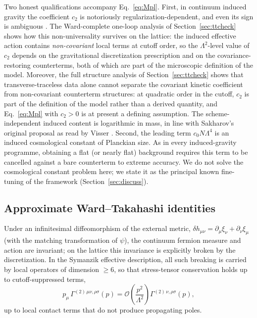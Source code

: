 \documentclass[11pt,a4paper]{article}
\begin{document}
Two honest qualifications accompany Eq.~\eqref{eq:Mpl}.
First, in continuum induced gravity the coefficient $c_2$ is
notoriously regularization-dependent, and even its sign is
ambiguous \cite{Visser:2002ew}.
The Ward-complete one-loop analysis of Section~\ref{sec:ttcheck}
shows how this non-universality survives on the lattice: the
induced effective action contains \emph{non-covariant} local terms
at cutoff order, so the $\Lambda^2$-level value of $c_2$ depends on
the gravitational discretization prescription and on the
covariance-restoring counterterms, both of which are part of the
microscopic definition of the model.
Moreover, the full structure analysis of
Section~\ref{sec:ttcheck} shows that transverse-traceless data
alone cannot separate the covariant kinetic coefficient from
non-covariant counterterm structures: at quadratic order in the
cutoff, $c_2$ is part of the definition of the model rather than a
derived quantity, and Eq.~\eqref{eq:Mpl} with $c_2 > 0$ is at
present a defining assumption.
The scheme-independent induced content is logarithmic in mass, in
line with Sakharov's original proposal as read by Visser
\cite{Visser:2002ew}.
Second, the leading term $c_0 N\Lambda^4$ is an induced
cosmological constant of Planckian size.
As in every induced-gravity programme, obtaining a flat (or nearly
flat) background requires this term to be cancelled against a bare
counterterm to extreme accuracy.
We do not solve the cosmological constant problem here; we state
it as the principal known fine-tuning of the framework
(Section~\ref{sec:discuss}).

\subsection{Approximate Ward--Takahashi identities}

Under an infinitesimal diffeomorphism of the external metric,
$\delta h_{\mu\nu} = \partial_\mu\xi_\nu + \partial_\nu\xi_\mu$
(with the matching transformation of $\psi$), the continuum
fermion measure and action are invariant; on the lattice this
invariance is explicitly broken by the discretization.
In the Symanzik effective description, all such breaking is carried
by local operators of dimension $\geq 6$, so that stress-tensor
conservation holds up to cutoff-suppressed terms,
\begin{equation}
p_\mu\,\Gamma^{(2)\,\mu\nu,\rho\sigma}(p)
= \mathcal{O}\!\left(\frac{p^2}{\Lambda^2}\right)
\Gamma^{(2)\,\nu,\rho\sigma}(p),
\label{eq:Ward}
\end{equation}
up to local contact terms that do not produce propagating poles.
\end{document}
